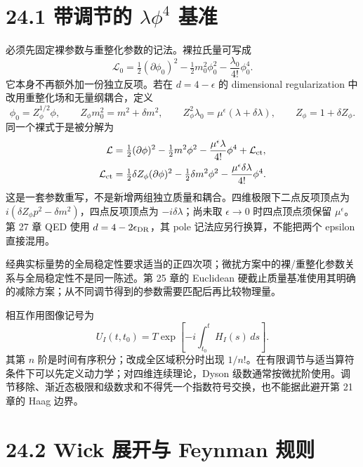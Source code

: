\documentclass[
  11pt,
  oneside]{book}
\begin{document}
\hypertarget{ux5e26ux8c03ux8282ux7684-lambdaphi4-ux57faux51c6}{%
\section{\texorpdfstring{24.1 带调节的 \(\lambda\phi^4\)
基准}{24.1 带调节的 \textbackslash lambda\textbackslash phi\^{}4 基准}}\label{ux5e26ux8c03ux8282ux7684-lambdaphi4-ux57faux51c6}}

必须先固定裸参数与重整化参数的记法。裸拉氏量可写成 \[
\mathcal L_0=\tfrac12(\partial\phi_0)^2
-\tfrac12m_0^2\phi_0^2-\frac{\lambda_0}{4!}\phi_0^4.
\] 它本身不再额外加一份独立反项。若在 \(d=4-\epsilon\) 的 dimensional
regularization 中改用重整化场和无量纲耦合，定义 \[
\phi_0=Z_\phi^{1/2}\phi,\qquad
Z_\phi m_0^2=m^2+\delta m^2,\qquad
Z_\phi^2\lambda_0=\mu^\epsilon(\lambda+\delta\lambda),
\qquad Z_\phi=1+\delta Z_\phi.
\] 同一个裸式于是被分解为 \[
\begin{aligned}
\mathcal L={}&\tfrac12(\partial\phi)^2-\tfrac12m^2\phi^2
-\frac{\mu^\epsilon\lambda}{4!}\phi^4+\mathcal L_{\rm ct},\\
\mathcal L_{\rm ct}={}&\tfrac12\delta Z_\phi(\partial\phi)^2
-\tfrac12\delta m^2\phi^2-\frac{\mu^\epsilon\delta\lambda}{4!}\phi^4.
\end{aligned}
\]
这是一套参数重写，不是新增两组独立质量和耦合。四维极限下二点反项顶点为
\(i(\delta Z_\phi p^2-\delta m^2)\)，四点反项顶点为
\(-i\delta\lambda\)；尚未取 \(\epsilon\to0\) 时四点顶点须保留
\(\mu^\epsilon\)。第 27 章 QED 使用 \(d=4-2\epsilon_{\rm DR}\)，其 pole
记法应另行换算，不能把两个 epsilon 直接混用。

经典实标量势的全局稳定性要求适当的正四次项；微扰方案中的裸/重整化参数关系与全局稳定性不是同一陈述。第
25 章的 Euclidean
硬截止质量基准使用其明确的减除方案；从不同调节得到的参数需要匹配后再比较物理量。

相互作用图像记号为 \[
U_I(t,t_0)=T\exp\left[-i\int_{t_0}^{t}H_I(s)\,ds\right].
\] 其第 \(n\) 阶是时间有序积分；改成全区域积分时出现
\(1/n!\)。在有限调节与适当算符条件下可以先定义动力学；对四维连续理论，Dyson
级数通常按微扰阶使用。调节移除、渐近态极限和级数求和不得凭一个指数符号交换，也不能据此避开第
21 章的 Haag 边界。

\hypertarget{wick-ux5c55ux5f00ux4e0e-feynman-ux89c4ux5219}{%
\section{24.2 Wick 展开与 Feynman
规则}\label{wick-ux5c55ux5f00ux4e0e-feynman-ux89c4ux5219}}
\end{document}

